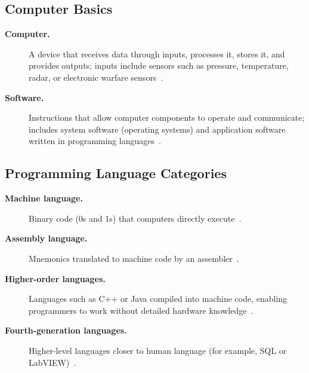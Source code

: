 \documentclass[../main.tex]{subfiles}
\begin{document}
\subsection{Computer Basics}
\begin{description}
  \item[\textbf{Computer.}] A device that receives data through inputs, processes it, stores it, and provides outputs; inputs include sensors such as pressure, temperature, radar, or electronic warfare sensors~\autocite{edo-3-4-1-software-acquisition-environment-2025}.
  \item[\textbf{Software.}] Instructions that allow computer components to operate and communicate; includes system software (operating systems) and application software written in programming languages~\autocite{edo-3-4-1-software-acquisition-environment-2025}.
\end{description}

\subsection{Programming Language Categories}
\begin{description}
  \item[\textbf{Machine language.}] Binary code (0s and 1s) that computers directly execute~\autocite{edo-3-4-1-software-acquisition-environment-2025}.
  \item[\textbf{Assembly language.}] Mnemonics translated to machine code by an assembler~\autocite{edo-3-4-1-software-acquisition-environment-2025}.
  \item[\textbf{Higher-order languages.}] Languages such as C++ or Java compiled into machine code, enabling programmers to work without detailed hardware knowledge~\autocite{edo-3-4-1-software-acquisition-environment-2025}.
  \item[\textbf{Fourth-generation languages.}] Higher-level languages closer to human language (for example, SQL or LabVIEW)~\autocite{edo-3-4-1-software-acquisition-environment-2025}.
\end{description}
\end{document}
